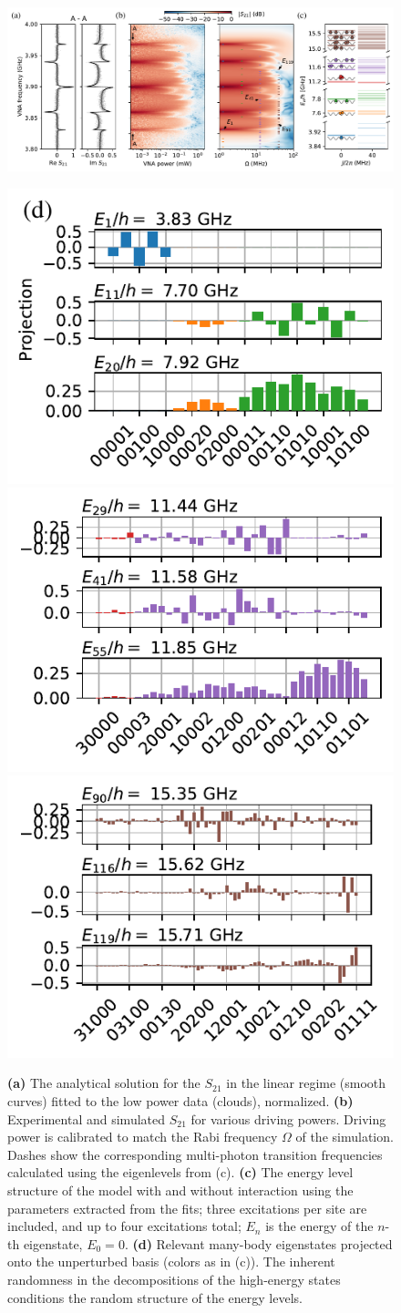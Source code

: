 \documentclass[%
 aps, prl,
 amsmath,amssymb,
 reprint,%
superscriptaddress
]{revtex4-2}
\begin{document}
\begin{figure}
	\centering
	\includegraphics[width=\linewidth]{Pictures/fig3}
	
	
	\includegraphics[width=.33\linewidth]{Pictures/eigenstates1}
	\includegraphics[width=.33\linewidth]{Pictures/eigenstates2}
	\includegraphics[width=.33\linewidth]{Pictures/eigenstates3}
	\caption{\textbf{(a)} The analytical solution for the $S_{21}$ in the linear regime (smooth curves) fitted to the low power data (clouds), normalized. \textbf{(b)} Experimental and simulated $S_{21}$ for various driving powers. Driving power is calibrated to match the Rabi frequency $\Omega$ of the simulation.  Dashes show the corresponding multi-photon transition frequencies calculated using the eigenlevels from (c).  \textbf{(c)} The energy level structure of the model with and without interaction using the parameters extracted from the fits; three excitations per site are included, and up to four excitations total; $E_n$ is the energy of the $n$-th eigenstate, $E_0 = 0$. \textbf{(d)} Relevant many-body eigenstates projected onto the unperturbed basis (colors as in (c)). The inherent randomness in the decompositions of the high-energy states conditions the random structure of the energy levels.}
	\label{fig:cq_transition}
\end{figure}
\end{document}
